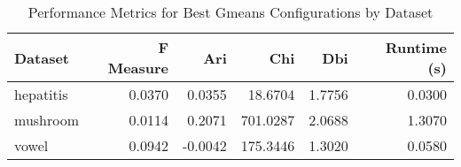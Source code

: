 \begin{table*}[ht!]
\caption{Performance Metrics for Best Gmeans Configurations by Dataset}
\label{tab:best_configs_gmeans_performance}
\begin{tabular}{lrrrrr}
Dataset & F Measure & Ari & Chi & Dbi & Runtime (s) \\\midrule

hepatitis & 0.0370 & 0.0355 & 18.6704 & 1.7756 & 0.0300 \\
mushroom & 0.0114 & 0.2071 & 701.0287 & 2.0688 & 1.3070 \\
vowel & 0.0942 & -0.0042 & 175.3446 & 1.3020 & 0.0580 \\
\end{tabular}
\end{table*}
